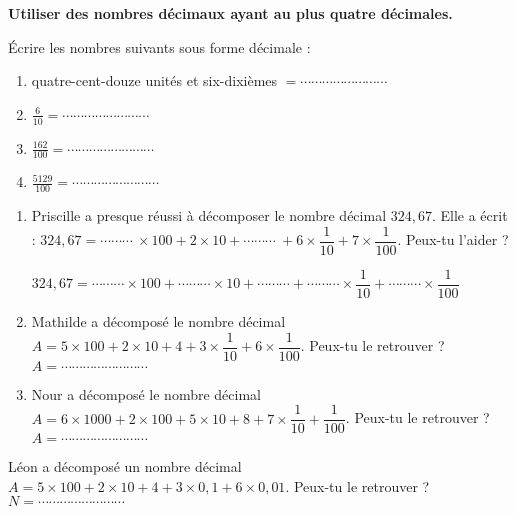 \textbf{Utiliser des nombres décimaux ayant au plus quatre décimales.}

\begin{enumerate}{0.5\linewidth}


Écrire les nombres suivants sous forme décimale :
\begin{enumerate}
\item quatre-cent-douze unités et six-dixièmes $= \cdots\cdots\cdots\cdots\cdots\cdots\cdots\cdots $
\item $\frac{6}{10}= \cdots\cdots\cdots\cdots\cdots\cdots\cdots\cdots$
\item $\frac{162}{100}= \cdots\cdots\cdots\cdots\cdots\cdots\cdots\cdots$
\item $\frac{5129}{100}= \cdots\cdots\cdots\cdots\cdots\cdots\cdots\cdots$
\end{enumerate}
 


\begin{enumerate}
\item Priscille a presque réussi à décomposer le nombre décimal  $324,67$. Elle a écrit : $324,67 = \cdots\cdots\cdots\  \times 100 + 2\times 10 + \cdots\cdots\cdots\ + 6\times \dfrac{1}{10} +  7 \times \dfrac{1}{100} $. Peux-tu l'aider ?

$324,67 = \cdots\cdots\cdots  \times 100 + \cdots\cdots\cdots \times 10 + \cdots\cdots\cdots  + \cdots\cdots\cdots \times \dfrac{1}{10} + \cdots\cdots\cdots \times \dfrac{1}{100} $

\item Mathilde a décomposé le nombre décimal  $A = 5\times 100 + 2\times 10 + 4 + 3\times \dfrac{1}{10} +  6\times \dfrac{1}{100} $. Peux-tu le retrouver ?
$A = \cdots\cdots\cdots\cdots\cdots\cdots\cdots\cdots $

\item Nour a décomposé le nombre décimal  $A = 6\times 1000 + 2\times 100 + 5\times 10 + 8 + 7\times \dfrac{1}{10} +   \dfrac{1}{100} $. Peux-tu le retrouver ?
$A = \cdots\cdots\cdots\cdots\cdots\cdots\cdots\cdots $
\end{enumerate}



Léon a décomposé un nombre décimal  $A = 5\times 100 + 2\times 10 + 4 + 3\times 0,1 +  6\times 0,01 $. Peux-tu le retrouver ?
$N = \cdots\cdots\cdots\cdots\cdots\cdots\cdots\cdots $



\end{enumerate}
